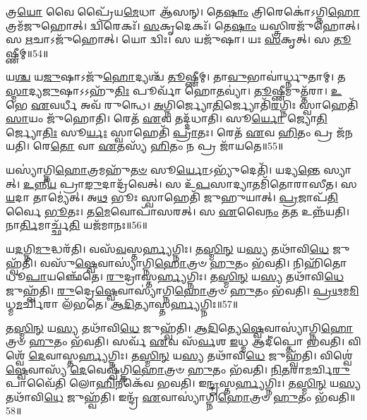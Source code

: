 𑌤𑍍𑌰\-\ul{𑌯𑍋} 𑌵𑍈 𑌪𑍍𑌰𑍈᳴𑌯\-\ul{𑌮𑍇}\-𑌧𑌾 𑌆᳴𑌸𑌨𑍍।
𑌤𑍇\-\ul{𑌷𑌾𑌂} 𑌤𑍍𑌰𑌿𑌰𑍇𑌕𑍋॑\-𑌽𑌗𑍍𑌨𑌿\-\ul{𑌹𑍋}\-𑌤𑍍𑌰𑌮᳴𑌜𑍁𑌹𑍋𑌤𑍍।
𑌦𑍍𑌵𑌿𑌰𑍇𑌕𑌃᳴।
\-\ul{𑌸}\-𑌕𑍃𑌦𑍇𑌕𑌃᳴।
𑌤𑍇\-\ul{𑌷𑌾𑌂} 𑌯𑌸𑍍𑌤𑍍𑌰𑌿𑌰𑌜𑍁᳴𑌹𑍋𑌤𑍍।
𑌸 \ul{𑌋}\-𑌚𑌾\-𑌽𑌜𑍁᳴𑌹𑍋𑌤𑍍।
𑌯𑍋 𑌦𑍍𑌵𑌿𑌃।
𑌸 𑌯𑌜𑍁᳴𑌷𑌾।
𑌯𑌃 \ul{𑌸}\-𑌕𑍃𑌤𑍍।
𑌸 \ul{𑌤𑍂}\-𑌷𑍍𑌣𑍀𑌮𑍍॥54॥

𑌯\-\ul{𑌶𑍍𑌚} 𑌯\-\ul{𑌜𑍁}\-𑌷𑌾\-𑌽𑌜𑍁᳴\-\ul{𑌹𑍋}\-𑌦𑍍𑌯𑌶𑍍𑌚᳴ \ul{𑌤𑍂}\-𑌷𑍍𑌣𑍀𑌮𑍍।
𑌤𑌾\-\ul{𑌵𑍁}\-𑌭𑌾𑌵𑌾॑𑌰𑍍𑌧𑍍𑌨𑍁𑌤𑌾𑌮𑍍।
𑌤\-\ul{𑌸𑍍𑌮𑌾}\-𑌦𑍍𑌯\-\ul{𑌜𑍁}\-𑌷𑌾\-𑌽𑌽𑌹𑍁᳴\-\ul{𑌤𑌿𑌃} 𑌪𑍂𑌰𑍍𑌵𑌾᳴ 𑌹𑍋\-\ul{𑌤}\-𑌵𑍍𑌯𑌾॑।
\-\ul{𑌤𑍂}\-𑌷𑍍𑌣𑍀𑌮𑍁𑌤𑍍𑌤᳴𑌰𑌾।
\-\ul{𑌉}\-𑌭𑍇 \ul{𑌏}\-𑌵𑌰𑍍𑌧𑍀 𑌅𑌵᳴ 𑌰𑍁𑌨𑍍𑌧𑍇।
\-\ul{𑌅}\-𑌗𑍍𑌨𑌿𑌰𑍍𑌜𑍍𑌯𑍋\-\ul{𑌤𑌿}\-𑌰𑍍𑌜𑍍𑌯𑍋𑌤𑌿᳴\-\ul{𑌰}\-𑌗𑍍𑌨𑌿𑌃 𑌸𑍍𑌵𑌾𑌹𑍇𑌤𑌿᳴ \ul{𑌸𑌾}\-𑌯𑌂 𑌜𑍁᳴𑌹𑍋𑌤𑌿।
𑌰𑍇𑌤᳴ \ul{𑌏}\-𑌵 𑌤𑌦𑍍𑌦᳴𑌧𑌾𑌤𑌿।
𑌸𑍂\-\ul{𑌰𑍍𑌯𑍋} 𑌜𑍍𑌯𑍋\-\ul{𑌤𑌿}\-𑌰𑍍𑌜𑍍𑌯𑍋\-\ul{𑌤𑌿𑌃} 𑌸𑍂\-\ul{𑌰𑍍𑌯𑌃} 𑌸𑍍𑌵𑌾𑌹𑍇𑌤𑌿᳴ \ul{𑌪𑍍𑌰𑌾}\-𑌤𑌃।
𑌰𑍇𑌤᳴ \ul{𑌏}\-𑌵 \ul{𑌹𑌿}\-𑌤𑌂 𑌪𑍍𑌰 𑌜᳴𑌨𑌯𑌤𑌿।
𑌰𑍇\-\ul{𑌤𑍋} 𑌵𑌾 \ul{𑌏}\-𑌤𑌸𑍍𑌯᳴ \ul{𑌹𑌿}\-𑌤𑌂 𑌨 𑌪𑍍𑌰 𑌜𑌾᳴𑌯𑌤𑍇॥55॥

𑌯𑌸𑍍𑌯𑌾॑𑌗𑍍𑌨𑌿\-\ul{𑌹𑍋}\-𑌤𑍍𑌰𑌮𑌹𑍁᳴\-\ul{𑌤}\-\-\ul{𑍞} 𑌸𑍂\-\ul{𑌰𑍍𑌯𑍋}\-\-𑌽𑌭𑍍𑌯𑍁᳴𑌦𑍇𑌤𑌿᳴।
𑌯𑌦𑍍𑌯\-\ul{𑌨𑍍𑌤𑍇} 𑌸𑍍𑌯𑌾𑌤𑍍।
\-\ul{𑌉}\-𑌨𑍍𑌨𑍀\-\ul{𑌯} 𑌪𑍍𑌰𑌾\-\ul{𑌙𑍁}\-𑌦𑌾𑌦𑍍𑌰᳴𑌵𑍇𑌤𑍍।
𑌸 𑌉᳴\-\ul{𑌪}\-𑌸𑌾𑌦𑍍𑌯𑌾𑌤𑌮𑌿᳴𑌤𑍋𑌰𑌾𑌸𑍀𑌤।
𑌸 \ul{𑌯}\-𑌦𑌾 𑌤𑌾𑌮𑍍𑌯𑍇॑𑌤𑍍।
𑌅\-\ul{𑌥} 𑌭𑍂𑌃 𑌸𑍍𑌵𑌾𑌹𑍇𑌤𑌿᳴ 𑌜𑍁𑌹𑍁𑌯𑌾𑌤𑍍।
\-\ul{𑌪𑍍𑌰}\-𑌜𑌾𑌪᳴\-\ul{𑌤𑌿}\-𑌰𑍍𑌵𑍈 \ul{𑌭𑍂}\-𑌤𑌃।
𑌤\-\ul{𑌮𑍇}\-𑌵𑍋𑌪𑌾᳴𑌸𑌰𑌤𑍍।
𑌸 \ul{𑌏}\-𑌵𑍈\-\ul{𑌨𑌂} 𑌤\-\ul{𑌤} 𑌉𑌨𑍍𑌨᳴𑌯𑌤𑌿।
𑌨𑌾\-\ul{𑌰𑍍𑌤𑌿}\-𑌮𑌾𑌰𑍍𑌚𑍍𑌛᳴\-\ul{𑌤𑌿} 𑌯𑌜᳴𑌮𑌾𑌨𑌃॥56॥\anuvakamend[\-\ul{𑌤𑍂}\-𑌷𑍍𑌣𑍀𑌂 𑌜𑌾᳴𑌯\-\ul{𑌤𑍇} 𑌯𑌜᳴𑌮𑌾𑌨𑌃]

𑌯\-\ul{𑌦}\-𑌗𑍍𑌨𑌿\-\ul{𑌮𑍁}\-𑌦𑍍𑌧𑌰᳴𑌤𑌿।
𑌵𑌸᳴\-\ul{𑌵}\-𑌸𑍍𑌤\-\ul{𑌰𑍍𑌹𑍍𑌯}\-𑌗𑍍𑌨𑌿𑌃।
𑌤\-\ul{𑌸𑍍𑌮𑌿}\-\-\ul{𑌨𑍍} 𑌯\-\ul{𑌸𑍍𑌯} 𑌤𑌥𑌾᳴𑌵𑌿\-\ul{𑌧𑍇} 𑌜𑍁𑌹𑍍𑌵᳴𑌤𑌿।
𑌵𑌸𑍁᳴\-\ul{𑌷𑍍𑌵𑍇}\-𑌵𑌾𑌸𑍍𑌯𑌾॑𑌗𑍍𑌨𑌿\-\ul{𑌹𑍋}\-𑌤𑍍𑌰𑍞 \ul{𑌹𑍁}\-𑌤𑌂 𑌭᳴𑌵𑌤𑌿।
𑌨𑌿𑌹𑌿᳴𑌤𑍋 𑌧𑍂\-\ul{𑌪𑌾}\-𑌯𑌞𑍍𑌛𑍇᳴𑌤𑍇।
\-\ul{𑌰𑍁}\-𑌦𑍍𑌰𑌾𑌸𑍍𑌤\-\ul{𑌰𑍍𑌹𑍍𑌯}\-𑌗𑍍𑌨𑌿𑌃।
𑌤\-\ul{𑌸𑍍𑌮𑌿}\-\-\ul{𑌨𑍍} 𑌯\-\ul{𑌸𑍍𑌯} 𑌤𑌥𑌾᳴𑌵𑌿\-\ul{𑌧𑍇} 𑌜𑍁𑌹𑍍𑌵᳴𑌤𑌿।
\-\ul{𑌰𑍁}\-𑌦𑍍𑌰𑍇\-\ul{𑌷𑍍𑌵𑍇}\-𑌵𑌾𑌸𑍍𑌯𑌾॑𑌗𑍍𑌨𑌿\-\ul{𑌹𑍋}\-𑌤𑍍𑌰𑍞 \ul{𑌹𑍁}\-𑌤𑌂 𑌭᳴𑌵𑌤𑌿।
\-\ul{𑌪𑍍𑌰}\-\-\ul{𑌥}\-𑌮\-\ul{𑌮𑌿}\-𑌧𑍍𑌮\-\ul{𑌮}\-𑌰𑍍𑌚𑌿𑌰𑌾 𑌲᳴𑌭𑌤𑍇।
\-\ul{𑌆}\-\-\ul{𑌦𑌿}\-𑌤𑍍𑌯𑌾𑌸𑍍𑌤\-\ul{𑌰𑍍𑌹𑍍𑌯}\-𑌗𑍍𑌨𑌿𑌃॥57॥

𑌤\-\ul{𑌸𑍍𑌮𑌿}\-\-\ul{𑌨𑍍} 𑌯\-\ul{𑌸𑍍𑌯} 𑌤𑌥𑌾᳴𑌵𑌿\-\ul{𑌧𑍇} 𑌜𑍁𑌹𑍍𑌵᳴𑌤𑌿।
\-\ul{𑌆}\-\-\ul{𑌦𑌿}\-𑌤𑍍𑌯𑍇\-\ul{𑌷𑍍𑌵𑍇}\-𑌵𑌾𑌸𑍍𑌯𑌾॑𑌗𑍍𑌨𑌿\-\ul{𑌹𑍋}\-𑌤𑍍𑌰𑍞 \ul{𑌹𑍁}\-𑌤𑌂 𑌭᳴𑌵𑌤𑌿।
𑌸𑌰𑍍𑌵᳴ \ul{𑌏}\-𑌵 𑌸᳴\-\ul{𑌰𑍍𑌵}\-𑌶 \ul{𑌇}\-𑌧𑍍𑌮 𑌆𑌦𑍀॑𑌪𑍍𑌤𑍋 𑌭𑌵𑌤𑌿।
𑌵𑌿𑌶𑍍𑌵𑍇᳴ \ul{𑌦𑍇}\-𑌵𑌾𑌸𑍍𑌤\-\ul{𑌰𑍍𑌹𑍍𑌯}\-𑌗𑍍𑌨𑌿𑌃।
𑌤\-\ul{𑌸𑍍𑌮𑌿}\-\-\ul{𑌨𑍍} 𑌯\-\ul{𑌸𑍍𑌯} 𑌤𑌥𑌾᳴𑌵𑌿\-\ul{𑌧𑍇} 𑌜𑍁𑌹𑍍𑌵᳴𑌤𑌿।
𑌵𑌿𑌶𑍍𑌵𑍇॑\-\ul{𑌷𑍍𑌵𑍇}\-𑌵𑌾𑌸𑍍𑌯᳴ \ul{𑌦𑍇}\-𑌵𑍇𑌷𑍍𑌵᳴𑌗𑍍𑌨𑌿\-\ul{𑌹𑍋}\-𑌤𑍍𑌰𑍞 \ul{𑌹𑍁}\-𑌤𑌂 𑌭᳴𑌵𑌤𑌿।
\-\ul{𑌨𑌿}\-\-\ul{𑌤}\-𑌰𑌾\-\ul{𑌮}\-𑌰𑍍𑌚𑌿\-\ul{𑌰𑍁}\-𑌪𑌾𑌵𑍈᳴𑌤𑌿 𑌲𑍋\-\ul{𑌹𑌿}\-𑌨𑍀𑌕𑍇᳴𑌵 𑌭𑌵𑌤𑌿।
𑌇\-\ul{𑌨𑍍𑌦𑍍𑌰}\-𑌸𑍍𑌤\-\ul{𑌰𑍍𑌹𑍍𑌯}\-𑌗𑍍𑌨𑌿𑌃।
𑌤\-\ul{𑌸𑍍𑌮𑌿}\-\-\ul{𑌨𑍍} 𑌯\-\ul{𑌸𑍍𑌯} 𑌤𑌥𑌾᳴𑌵𑌿\-\ul{𑌧𑍇} 𑌜𑍁𑌹𑍍𑌵᳴𑌤𑌿।
𑌇𑌨𑍍𑌦𑍍𑌰᳴ \ul{𑌏}\-𑌵𑌾𑌸𑍍𑌯𑌾॑𑌗𑍍𑌨𑌿\-\ul{𑌹𑍋}\-𑌤𑍍𑌰𑍞 \ul{𑌹𑍁}\-𑌤𑌂 𑌭᳴𑌵𑌤𑌿॥58॥

